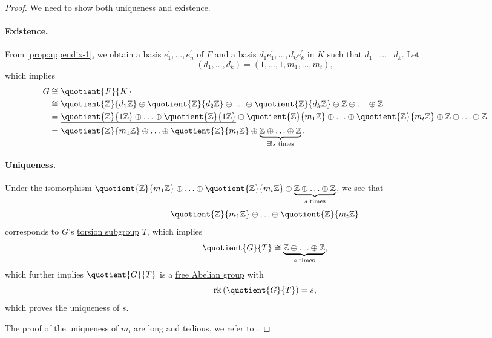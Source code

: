 \begin{proof}
	We need to show both uniqueness and existence.
	\paragraph{Existence.} From \autoref{prop:appendix-1}, we obtain a basis \(e_1^\prime , \ldots , e_{n} ^\prime\) of \(F\) and a basis \(d_1 e_1^\prime , \ldots , d_{k} e_{k} ^\prime\) in \(K\)
	such that \(d_1\mid \ldots \mid d_k \). Let
	\[
		(d_1, \ldots , d_{k}) = (1, \ldots , 1, m_1, \ldots , m_{t}),
	\]
	which implies
	\[
		\begin{split}
			G&\cong \quotient{F}{K} \\
			&\cong \quotient{\mathbb{\MakeUppercase{z}} }{d_1 \mathbb{\MakeUppercase{z}} } \oplus \quotient{\mathbb{\MakeUppercase{z}} }{d_2 \mathbb{\MakeUppercase{z}} } \oplus \ldots \oplus \quotient{\mathbb{\MakeUppercase{z}} }{d_k \mathbb{\MakeUppercase{z}} }  \oplus \mathbb{\MakeUppercase{z}} \oplus \ldots \oplus \mathbb{\MakeUppercase{z}}\\
			&= \underline{\quotient{\mathbb{\MakeUppercase{z}} }{1 \mathbb{\MakeUppercase{z}} } \oplus \ldots \oplus \quotient{\mathbb{\MakeUppercase{z}} }{1 \mathbb{\MakeUppercase{z}} }} \oplus\quotient{\mathbb{\MakeUppercase{z}} }{m_1 \mathbb{\MakeUppercase{z}} } \oplus \ldots \oplus \quotient{\mathbb{\MakeUppercase{z}} }{m_{t}  \mathbb{\MakeUppercase{z}} }  \oplus \mathbb{\MakeUppercase{z}} \oplus \ldots \oplus \mathbb{\MakeUppercase{z}}\\
			&= \quotient{\mathbb{\MakeUppercase{z}} }{m_1 \mathbb{\MakeUppercase{z}} } \oplus \ldots \oplus \quotient{\mathbb{\MakeUppercase{z}} }{m_t \mathbb{\MakeUppercase{z}} }  \oplus \underbrace{\mathbb{\MakeUppercase{z}} \oplus \ldots \oplus \mathbb{\MakeUppercase{z}}  }_{\exists ! s \text{ times}}.
		\end{split}
	\]

	\paragraph{Uniqueness.} Under the isomorphism \(\quotient{\mathbb{\MakeUppercase{z}} }{m_1 \mathbb{\MakeUppercase{z}} } \oplus \ldots \oplus \quotient{\mathbb{\MakeUppercase{z}} }{m_t \mathbb{\MakeUppercase{z}} }  \oplus \underbrace{\mathbb{\MakeUppercase{z}} \oplus \ldots \oplus \mathbb{\MakeUppercase{z}}  }_{s \text{ times}}\),
	we see that
	\[
		\quotient{\mathbb{\MakeUppercase{z}} }{m_1 \mathbb{\MakeUppercase{z}} } \oplus \ldots \oplus \quotient{\mathbb{\MakeUppercase{z}} }{m_t \mathbb{\MakeUppercase{z}} }
	\]
	corresponds to \(G\)'s \hyperref[def:torsion-subgroup]{torsion subgroup} \(T\), which implies
	\[
		\quotient{G}{T} \cong \underbrace{\mathbb{\MakeUppercase{z}} \oplus \ldots \oplus \mathbb{\MakeUppercase{z}}  }_{\text{\(s\) times} },
	\]
	which further implies \(\quotient{G}{T} \) is a \hyperref[def:free-Abelian-group]{free Abelian group} with
	\[
		\mathrm{rk} \left(\quotient{G}{T} \right) = s,
	\]
	which proves the uniqueness of \(s\).

	The proof of the uniqueness of \(m_{i} \) are long and tedious, we refer to \cite{armstrong2013basic}.
\end{proof}

